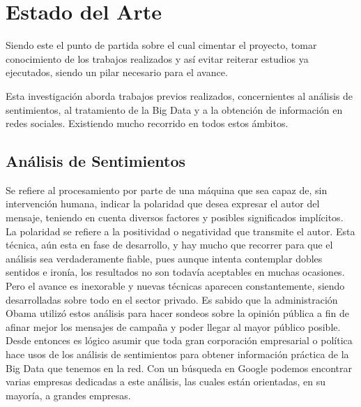 
\chapter{Estado del Arte }

 Siendo este el punto de partida sobre el cual cimentar el proyecto, tomar conocimiento de los trabajos realizados y así evitar reiterar estudios ya ejecutados, siendo un pilar necesario para el avance.

Esta investigación aborda trabajos previos realizados, concernientes al análisis de sentimientos, al tratamiento de la Big Data y a la obtención de información en redes sociales. Existiendo mucho recorrido en todos estos ámbitos. 

\section{Análisis de Sentimientos}

Se refiere al procesamiento por parte de una máquina que sea capaz de, sin intervención humana, indicar la polaridad que desea expresar el autor del mensaje, teniendo en cuenta diversos factores y posibles significados implícitos. La polaridad se refiere a la positividad o negatividad que transmite el autor. Esta técnica, aún esta en fase de desarrollo, y hay mucho que recorrer para que el análisis sea verdaderamente fiable, pues aunque intenta contemplar dobles sentidos e ironía, los resultados no son todavía aceptables en muchas ocasiones. Pero el avance es inexorable y nuevas técnicas aparecen constantemente, siendo desarrolladas sobre todo en el sector privado. Es sabido que la administración Obama utilizó estos análisis para hacer sondeos sobre la opinión pública a fin de afinar mejor los mensajes de campaña y poder llegar al mayor público posible. Desde entonces es lógico asumir que toda gran corporación empresarial o política hace usos de los análisis de sentimientos para obtener información práctica de la Big Data que tenemos en la red. Con un búsqueda en Google podemos encontrar varias empresas dedicadas a este análisis, las cuales están orientadas, en su mayoría, a grandes empresas.  

